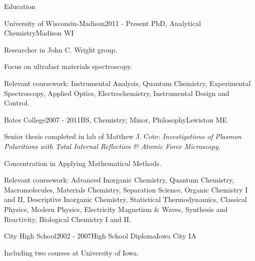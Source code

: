 \documentclass{resume}  %
\begin{document}
\begin{rSection}{Education}
  \begin{rSubsection}{University of Wisconsin-Madison}{2011 - Present}
    {PhD, Analytical Chemistry}{Madison WI}
    \item Researcher in John C. Wright group.
    \item Focus on ultrafast materials spectroscopy.
    \item Relevant coursework: Instrumental Analysis, Quantum Chemistry, 
      Experimental Spectroscopy, Applied Optics, Electrochemistry, 
      Instrumental Design and Control.
  \end{rSubsection}
  \begin{rSubsection}{Bates College}{2007 - 2011}{BS, Chemistry; Minor, Philosophy}{Lewiston ME}
    \item Senior thesis completed in lab of Matthew J. Cote: \textit{Investigations of
      Plasmon Polaritions with Total Internal Reflection \& Atomic Force Microscopy}.
    \item Concentration in Applying Mathematical Methods.
    \item Relevant coursework: Advanced Inorganic Chemistry, Quantum Chemistry, Macromolecules,
      Materials Chemistry, Separation Science, Organic Chemistry I and II,
      Descriptive Inorganic Chemistry, Statistical Thermodynamics, Classical Physics,
      Modern Physics, Electricity Magnetism \& Waves, Synthesis and Reactivity,
      Biological Chemistry I and II.
  \end{rSubsection}
  \begin{rSubsection}{City High School}{2002 - 2007}{High School Diploma}{Iowa City IA}
    \item Including two courses at University of Iowa.
  \end{rSubsection}
\end{rSection}
\end{document}
